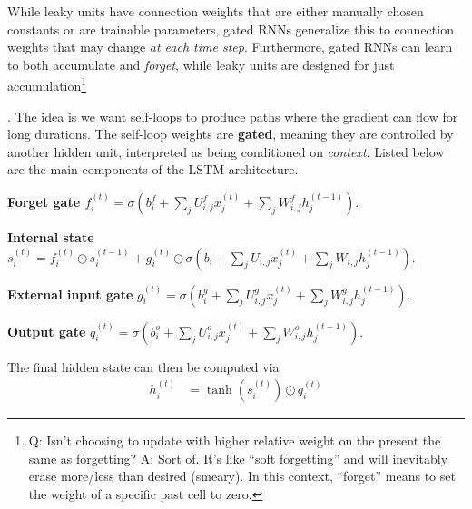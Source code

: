 \documentclass[11pt]{article}
\begin{document}
\myspace\myspace{}

\p While leaky units have connection weights that are either manually chosen constants or are trainable parameters, gated RNNs generalize this to connection weights that may change \textit{at each time step}. Furthermore, gated RNNs can learn to both accumulate and \textit{forget}, while leaky units are designed for just accumulation\footnote{Q: Isn't choosing to update with higher relative weight on the present the same as forgetting? A: Sort of. It's like ``soft forgetting'' and will inevitably erase more/less than desired (smeary). In this context, ``forget'' means to set the weight of a specific past cell to zero.}

\myspace
\p {}. The idea is we want self-loops to produce paths where the gradient can flow for long durations. The self-loop weights are \textbf{gated}, meaning they are controlled by another hidden unit, interpreted as being conditioned on \textit{context}. Listed below are the main components of the LSTM architecture.
\begin{compactitem}
	\item \textbf{Forget gate $f_i^{(t)} 
		= \sigma\left(b_i^f + \sum_j U_{i,j}^f x_j^{(t)} + \sum_j W_{i,j}^f h_j^{(t-1)}    \right)
		$}. 
	
	\item \textbf{Internal state} $s_i^{(t)}
		= f_i^{(t)} \odot s_i^{(t-1)} + g_i^{(t)} \odot \sigma\left(b_i + \sum_j U_{i,j} x_j^{(t)} + \sum_j W_{i,j} h_j^{(t-1)}  \right)
		$. 
	
	\item \textbf{External input gate} $g_i^{(t)}
	= \sigma\left(b_i^g + \sum_j U_{i,j}^g x_j^{(t)} + \sum_j W_{i,j}^g h_j^{(t-1)}    \right)
	$.
	
	\item \textbf{Output gate} $q_i^{(t)}
	= \sigma\left(b_i^o + \sum_j U_{i,j}^o x_j^{(t)} + \sum_j W_{i,j}^o h_j^{(t-1)}    \right)
	$. 
\end{compactitem}
The final hidden state can then be computed via
\begin{align}
	h_i^{(t)} &= \tanh(s_i^{(t)}) \odot q_i^{(t)}
\end{align}
\end{document}

